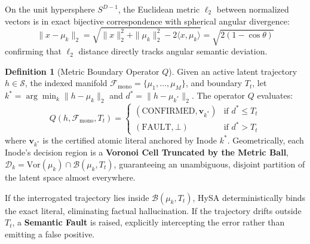 \documentclass[11pt,a4paper]{article}
\theoremstyle{definition}
\newtheorem{definition}{Definition}
\begin{document}
On the unit hypersphere $S^{D-1}$, the Euclidean metric $\ell_2$ between normalized vectors is in exact bijective correspondence with spherical angular divergence:
\begin{equation}
    \|x - \mu_k\|_2 = \sqrt{\|x\|_2^2 + \|\mu_k\|_2^2 - 2 \langle x, \mu_k \rangle} = \sqrt{2(1 - \cos\theta)}
\end{equation}
confirming that $\ell_2$ distance directly tracks angular semantic deviation.

\begin{definition}[Metric Boundary Operator $Q$]
Given an active latent trajectory $h \in \mathcal{S}$, the indexed manifold $\mathcal{F}_{\mathrm{mono}} = \{\mu_1, \dots, \mu_M\}$, and boundary $T_t$, let $k^* = \arg\min_k \|h - \mu_k\|_2$ and $d^* = \|h - \mu_{k^*}\|_2$. The operator $Q$ evaluates:
{\small
\begin{equation}
    Q(h, \mathcal{F}_{\mathrm{mono}}, T_t) = 
    \begin{cases} 
      (\mathrm{CONFIRMED}, \mathbf{v}_{k^*}) & \text{if } d^* \le T_t \\ 
      (\mathrm{FAULT}, \bot) & \text{if } d^* > T_t 
    \end{cases}
    \label{eq:query_operator}
\end{equation}
}
where $\mathbf{v}_{k^*}$ is the certified atomic literal anchored by Inode $k^*$. Geometrically, each Inode's decision region is a \textbf{Voronoi Cell Truncated by the Metric Ball}, $\mathcal{D}_k = \mathrm{Vor}(\mu_k) \cap \mathcal{B}(\mu_k, T_t)$, guaranteeing an unambiguous, disjoint partition of the latent space almost everywhere.
\end{definition}

If the interrogated trajectory lies inside $\mathcal{B}(\mu_k, T_t)$, HySA deterministically binds the exact literal, eliminating factual hallucination. If the trajectory drifts outside $T_t$, a \textbf{Semantic Fault} is raised, explicitly intercepting the error rather than emitting a false positive.
\end{document}
